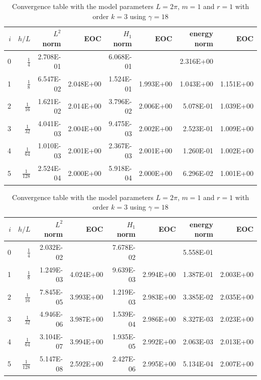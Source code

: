 \begin{table}
  \caption{\label{tab:ex2_order:a} Convergence table with the model parameters $L=2\pi$, $m=1$ and $r=1$ with order $k=2$ using $ \gamma = 9$}
  \begin{tabular}{rrrrrrrr}
    \hline\hline
    $i$&\textbf{$h/{L} $} & \textbf{$L^2$ norm} & \textbf{EOC} & \textbf{$H_1$ norm} & \textbf{EOC} & \textbf{energy norm} & \textbf{EOC} \\\hline
    0&$\frac{1}{4}$ & 2.708E-01 &  & 6.068E-01 &  & 2.316E+00 &  \\
    1&$\frac{1}{8}$ & 6.547E-02 & 2.048E+00 & 1.524E-01 & 1.993E+00 & 1.043E+00 & 1.151E+00 \\
    2&$\frac{1}{16}$ & 1.621E-02 & 2.014E+00 & 3.796E-02 & 2.006E+00 & 5.078E-01 & 1.039E+00 \\
    3&$\frac{1}{32}$ & 4.041E-03 & 2.004E+00 & 9.475E-03 & 2.002E+00 & 2.523E-01 & 1.009E+00 \\
    4&$\frac{1}{64}$ & 1.010E-03 & 2.001E+00 & 2.367E-03 & 2.001E+00 & 1.260E-01 & 1.002E+00 \\
    5&$\frac{1}{128}$ & 2.524E-04 & 2.000E+00 & 5.918E-04 & 2.000E+00 & 6.296E-02 & 1.001E+00 \\\hline\hline
  \end{tabular}

  \caption{\label{tab:ex2_order:b} Convergence table with the model parameters $L=2\pi$, $m=1$ and $r=1$ with order $k=3$ using $ \gamma = 18$}
  \begin{tabular}{rrrrrrrr}
    \hline\hline
    $i$&\textbf{$h/{L} $} & \textbf{$L^2$ norm} & \textbf{EOC} & \textbf{$H_1$ norm} & \textbf{EOC} & \textbf{energy norm} & \textbf{EOC} \\\hline
    0&$\frac{1}{4}$ & 2.032E-02 &  & 7.678E-02 &  & 5.558E-01 &  \\
    1&$\frac{1}{8}$ & 1.249E-03 & 4.024E+00 & 9.639E-03 & 2.994E+00 & 1.387E-01 & 2.003E+00 \\
    2&$\frac{1}{16}$ & 7.845E-05 & 3.993E+00 & 1.219E-03 & 2.983E+00 & 3.385E-02 & 2.035E+00 \\
    3&$\frac{1}{32}$ & 4.946E-06 & 3.987E+00 & 1.539E-04 & 2.986E+00 & 8.327E-03 & 2.023E+00 \\
    4&$\frac{1}{64}$ & 3.104E-07 & 3.994E+00 & 1.935E-05 & 2.992E+00 & 2.063E-03 & 2.013E+00 \\
    5&$\frac{1}{128}$ & 5.147E-08 & 2.592E+00 & 2.427E-06 & 2.995E+00 & 5.134E-04 & 2.007E+00 \\\hline\hline
  \end{tabular}


\end{table}
